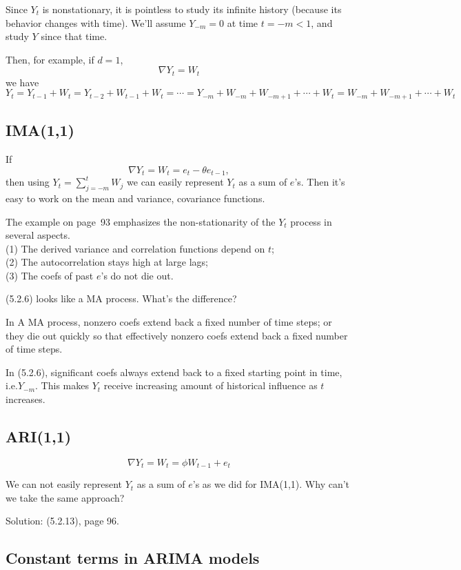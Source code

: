 \documentclass[12pt]{article}
\begin{document}
\begin{enumerate}
Since $Y_t$ is nonstationary,
it is pointless to study its infinite history
(because its behavior changes with time).
We'll assume $Y_{-m} = 0$ at time $t = -m < 1$,
and study $Y$ since that time.

Then, for example, if $d = 1$,
\[
\nabla Y_t = W_t
\]
we have
\[
Y_t
= Y_{t-1} + W_t
= Y_{t-2} + W_{t-1} + W_t
= \dotsb
= Y_{-m} + W_{-m} + W_{-m+1} +\dotsb+ W_t
= W_{-m} + W_{-m+1} +\dotsb+ W_t
\]

\subsection{IMA(1,1)}

If
\[
\nabla Y_t
= W_t
= e_t - \theta e_{t-1}
,
\]
then using $Y_t = \sum_{j=-m}^t W_j$
we can easily represent $Y_t$ as a sum of
$e$'s.
Then it's easy to work on the mean and variance, covariance functions.

\alert
The example on page~93 emphasizes the non-stationarity of the $Y_t$
process in several aspects.\\
(1) The derived variance and correlation functions depend on $t$;\\
(2) The autocorrelation stays high at large lags;\\
(3) The coefs of past $e$'s do not die out.

\alert
(5.2.6) looks like a MA process. What's the difference?

In A MA process, nonzero coefs extend back a fixed number of
time steps; or they die out quickly so that effectively nonzero coefs
extend back a fixed number of time steps.

In (5.2.6), significant coefs always extend back to a fixed starting
point in time, i.e.\@ $Y_{-m}$.
This makes $Y_t$ receive increasing amount of historical influence
as $t$ increases.

\subsection{ARI(1,1)}

\[
\nabla Y_t = W_t = \phi W_{t-1} + e_t
\]

We can not easily represent $Y_t$ as a sum of $e$'s as we did for
IMA(1,1). Why can't we take the same approach?

Solution:
(5.2.13), page 96.


\subsection{Constant terms in ARIMA models}


\end{enumerate}
\end{document}
